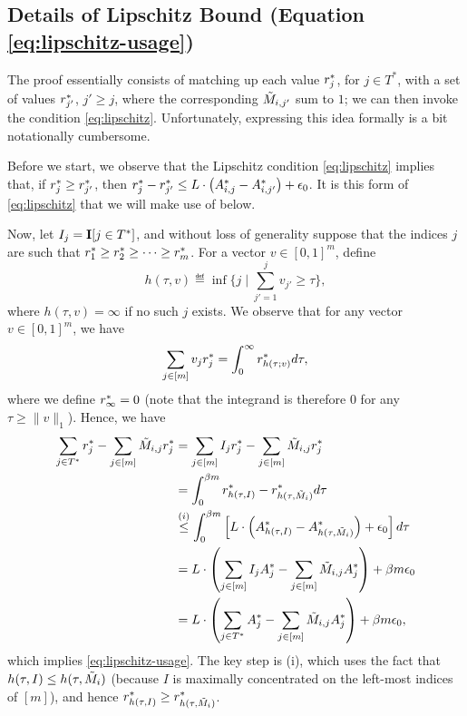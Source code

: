 \subsection{Details of Lipschitz Bound (Equation \ref{eq:lipschitz-usage})}
\label{sec:lipschitz-details}

The proof essentially consists of matching up each value $r^*_j$, for 
$j \in T^*$, with a set of values $r^*_{j'}$, $j' \geq j$, where the 
corresponding $\tilde{M}_{i,j'}$ sum to $1$; we can then invoke the condition 
\eqref{eq:lipschitz}. Unfortunately, expressing this idea 
formally is a bit notationally cumbersome.

Before we start, we observe that the Lipschitz condition \eqref{eq:lipschitz} 
implies that, if $r^*_j \geq r^*_{j'}$, then 
$r^*_j - r^*_{j'} \leq L \cdot \left( A^*_{i,j} - A^*_{i,j'} \right) + \epsilon_0$. 
It is this form of \eqref{eq:lipschitz} that we will make use of below.

Now, let $I_j = \mathbf{I}[j \in T^*]$, and without loss of generality suppose that 
the indices $j$ are such that $r^*_1 \geq r^*_2 \geq \cdots \geq r^*_m$. 
For a vector $v \in [0,1]^m$, define
\begin{equation}
\label{eq:def-h}
h(\tau, v) \eqdef \inf\{j \mid \sum_{j' = 1}^j v_{j'} \geq \tau\},
\end{equation} 
where $h(\tau,v) = \infty$ if no such $j$ exists.
We observe that for any vector $v \in [0,1]^m$, we have 
\begin{equation}
\label{eq:sum-integral}
\sum_{j \in [m]} v_jr^*_j = \int_{0}^{\infty} r^*_{h(\tau; v)} d\tau,
\end{equation}
where we define $r^*_{\infty} = 0$ (note that the integrand is therefore $0$ 
for any $\tau \geq \|v\|_1$). Hence, we have
\begin{align}
\sum_{j \in T^*} r^*_j - \sum_{j \in [m]} \tilde{M}_{i,j}r^*_j 
 &= \sum_{j \in [m]} I_jr^*_j - \sum_{j \in [m]} \tilde{M}_{i,j}r^*_j \\
 &= \int_{0}^{\beta m} r^*_{h(\tau, I)} - r^*_{h(\tau, \tilde{M}_i)} d\tau \\
 &\stackrel{(i)}{\leq} \int_{0}^{\beta m} \left[L \cdot \left( A^*_{h(\tau, I)} - A^*_{h(\tau, \tilde{M}_i)} \right) + \epsilon_0\right] d\tau \\
 &= L\cdot \left( \sum_{j \in [m]} I_jA^*_j - \sum_{j \in [m]} \tilde{M}_{i,j}A^*_j \right) + \beta m\epsilon_0 \\
 &= L\cdot \left( \sum_{j \in T^*} A^*_j - \sum_{j \in [m]} \tilde{M}_{i,j}A^*_j \right) + \beta m\epsilon_0,
\end{align}
which implies \eqref{eq:lipschitz-usage}. The key step is (i), 
which uses the fact that $h(\tau,I) \leq h(\tau, \tilde{M}_i)$ (because $I$ is 
maximally concentrated on the left-most indices of $[m]$), and hence 
$r^*_{h(\tau,I)} \geq r^*_{h(\tau, \tilde{M}_i)}$.

